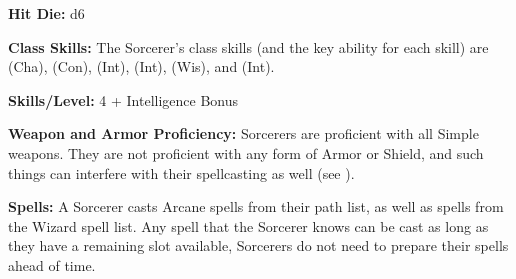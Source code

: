 \textbf{Hit Die:} d6

\textbf{Class Skills:} The Sorcerer's class skills (and the key ability for each skill) are  (Cha),  (Con),  (Int),  (Int),  (Wis), and  (Int).

\textbf{Skills/Level:} 4 + Intelligence Bonus

\poorbab{}
\poorfor{}
\poorref{}
\goodwil{}

\begin{fullcastingclasstable}
\end{fullcastingclasstable}

\classfeatures

\textbf{Weapon and Armor Proficiency:} Sorcerers are proficient with all Simple weapons. They are not proficient with any form of Armor or Shield, and such things can interfere with their spellcasting as well (see ).

\textbf{Spells:} A Sorcerer casts Arcane spells from their path list, as well as spells from the Wizard spell list. Any spell that the Sorcerer knows can be cast as long as they have a remaining slot available, Sorcerers do not need to prepare their spells ahead of time.

